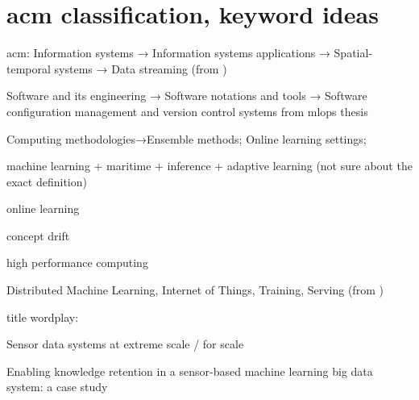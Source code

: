 \section{acm classification,  keyword ideas}

acm:
Information systems → Information systems applications →
Spatial-temporal systems → Data streaming (from \cite{uprctrajectorysystem})

Software and its engineering → Software notations and tools → Software configuration management and version control systems from mlops thesis

 Computing methodologies→Ensemble methods; Online learning settings;

machine learning + maritime + inference + 
adaptive learning (not sure about the exact definition)

online learning

concept drift

high performance computing

Distributed Machine Learning, Internet of Things, Training, Serving (from \cite{mliot})

title wordplay:

Sensor data systems at extreme scale / for scale

Enabling knowledge retention in a sensor-based machine learning big data system: a case study

